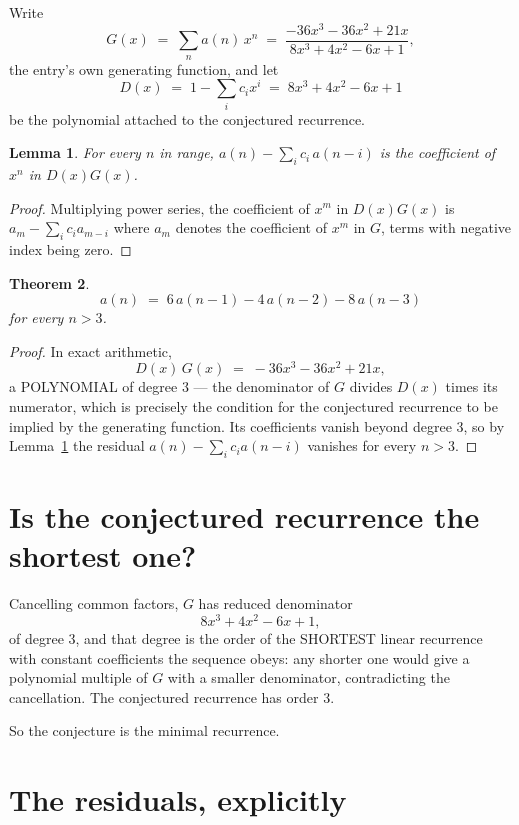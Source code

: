 \documentclass[11pt,a4paper]{article}
\theoremstyle{plain}
\newtheorem{theorem}{Theorem}
\newtheorem{lemma}[theorem]{Lemma}
\theoremstyle{definition}
\begin{document}
Write
\[
G(x)\;=\;\sum_{n}a(n)\,x^{n}\;=\;\frac{- 36 x^{3} - 36 x^{2} + 21 x}{8 x^{3} + 4 x^{2} - 6 x + 1},
\]
the entry's own generating function, and let
\[
D(x)\;=\;1-\sum_i c_i x^{i}\;=\;8 x^{3} + 4 x^{2} - 6 x + 1
\]
be the polynomial attached to the conjectured recurrence.

\begin{lemma}\label{lem:key}
For every $n$ in range, $a(n)-\sum_i c_i\,a(n-i)$ is the coefficient of $x^{n}$ in
$D(x)G(x)$.
\end{lemma}

\begin{proof}
Multiplying power series, the coefficient of $x^{m}$ in $D(x)G(x)$ is
$a_m-\sum_i c_i a_{m-i}$ where $a_m$ denotes the coefficient of $x^{m}$ in $G$, terms with
negative index being zero.
\end{proof}

\begin{theorem}
\[
a(n)\;=\;6\,a(n-1) - 4\,a(n-2) - 8\,a(n-3)
\]
for every $n>3$.
\end{theorem}

\begin{proof}
In exact arithmetic,
\[
D(x)\,G(x)\;=\;- 36 x^{3} - 36 x^{2} + 21 x,
\]
a POLYNOMIAL of degree $3$ --- the denominator of $G$ divides $D(x)$ times its numerator,
which is precisely the condition for the conjectured recurrence to be implied by the
generating function. Its coefficients vanish beyond degree $3$, so by
Lemma~\ref{lem:key} the residual $a(n)-\sum_ic_ia(n-i)$ vanishes for every
$n>3$.
\end{proof}

\section{Is the conjectured recurrence the shortest one?}

Cancelling common factors, $G$ has reduced denominator
\[
8 x^{3} + 4 x^{2} - 6 x + 1,
\]
of degree $3$, and that degree is the order of the SHORTEST linear recurrence with
constant coefficients the sequence obeys: any shorter one would give a polynomial multiple of
$G$ with a smaller denominator, contradicting the cancellation. The conjectured recurrence has
order $3$.

So the conjecture is the minimal recurrence.

\section{The residuals, explicitly}
\end{document}
